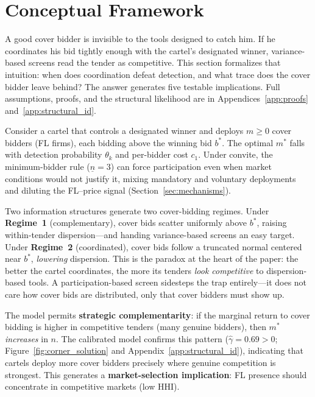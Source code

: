 
\section{Conceptual Framework}
\label{sec:structural}

A good cover bidder is invisible to the tools designed to catch
him. If he coordinates his bid tightly enough with the cartel's
designated winner, variance-based screens read the tender as
competitive. This section formalizes that intuition: when does
coordination defeat detection, and what trace does the cover bidder
leave behind? The answer generates five testable implications. Full
assumptions, proofs, and the structural likelihood are in
Appendices~\ref{app:proofs} and~\ref{app:structural_id}.

Consider a cartel that controls a designated winner and deploys
$m \geq 0$ cover bidders (FL firms), each bidding above the winning
bid $b^*$. The optimal $m^*$ falls with detection probability
$\theta_k$ and per-bidder cost $c_1$. Under convite, the
minimum-bidder rule ($\underline{n} = 3$) can force participation
even when market conditions would not justify it, mixing mandatory
and voluntary deployments and diluting the FL--price signal
(Section~\ref{sec:mechanisms}).

Two information structures generate two cover-bidding regimes.
Under \textbf{Regime~1} (complementary), cover bids scatter uniformly
above $b^*$, raising within-tender dispersion---and handing
variance-based screens an easy target. Under \textbf{Regime~2}
(coordinated), cover bids follow a truncated normal centered near
$b^*$, \emph{lowering} dispersion. This is the paradox at the heart
of the paper: the better the cartel coordinates, the more its
tenders \emph{look competitive} to dispersion-based tools. A
participation-based screen sidesteps the trap entirely---it does not
care how cover bids are distributed, only that cover bidders must
show up.

The model permits \textbf{strategic complementarity}: if the
marginal return to cover bidding is higher in competitive tenders
(many genuine bidders), then $m^*$ \emph{increases} in $n$. The
calibrated model confirms this pattern ($\hat{\gamma} = 0.69 > 0$;
Figure~\ref{fig:corner_solution} and
Appendix~\ref{app:structural_id}), indicating that cartels deploy
more cover bidders precisely where genuine competition is strongest.
This generates a \textbf{market-selection implication}: FL presence
should concentrate in competitive markets (low HHI).

